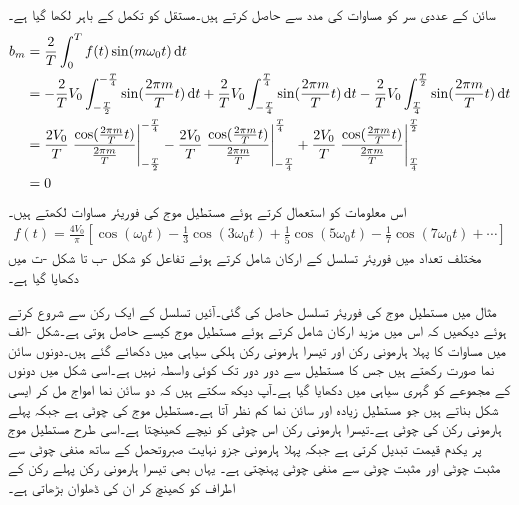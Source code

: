 سائن کے عددی سر  کو مساوات  کی مدد سے حاصل کرتے ہیں۔مستقل  کو تکمل کے باہر لکھا گیا ہے۔
\begin{align*}
b_m&=\frac{2}{T}\int_0^T f(t)\sin(m\omega_0 t) \dif t\\
&=-\frac{2}{T}V_0\int_{-\frac{T}{2}}^{-\frac{T}{4}} \sin (\frac{2\pi m}{T} t) \dif t+\frac{2}{T}V_0\int_{-\frac{T}{4}}^{\frac{T}{4}} \sin (\frac{2\pi m}{T} t) \dif t-\frac{2}{T}V_0\int_{\frac{T}{4}}^{\frac{T}{2}} \sin (\frac{2\pi m}{T} t) \dif t\\
&=\frac{2V_0}{T}\left.\frac{\cos (\frac{2\pi m}{T} t)}{\frac{2\pi m}{T}}\right|_{-\frac{T}{2}}^{-\frac{T}{4}}-\frac{2V_0}{T}\left.\frac{\cos (\frac{2\pi m}{T} t)}{\frac{2\pi m}{T}}\right|_{-\frac{T}{4}}^{\frac{T}{4}}+\frac{2V_0}{T}\left.\frac{\cos (\frac{2\pi m}{T} t)}{\frac{2\pi m}{T}}\right|_{\frac{T}{4}}^{\frac{T}{2}}\\
&=0
\end{align*}
اس معلومات کو استعمال کرتے ہوئے مستطیل موج کی فوریئر مساوات لکھتے ہیں۔
\begin{align}\label{مساوات_فوریئر_مستطیل_موج}
f(t)=\frac{4V_0}{\pi}\left[\cos (\omega_0 t)-\frac{1}{3}\cos(3\omega_0 t)+\frac{1}{5}\cos(5\omega_0 t)-\frac{1}{7}\cos(7\omega_0 t)+\cdots\right]
\end{align}
مختلف تعداد میں فوریئر تسلسل کے ارکان شامل کرتے ہوئے تفاعل کو شکل -ب تا شکل -ت میں دکھایا گیا ہے۔

مثال  میں مستطیل موج کی فوریئر تسلسل  حاصل کی گئی۔آئیں تسلسل کے ایک رکن سے شروع کرتے ہوئے دیکھیں کہ اس میں مزید ارکان شامل کرتے ہوئے مستطیل موج کیسے حاصل ہوتی ہے۔شکل -الف میں  مساوات  کا پہلا ہارمونی رکن  اور تیسرا ہارمونی رکن  ہلکی سیاہی میں دکھائے گئے ہیں۔دونوں سائن نما صورت رکھتے ہیں جس کا مستطیل سے دور دور تک کوئی واسطہ نہیں ہے۔اسی شکل میں دونوں کے مجموعے کو گہری سیاہی میں دکھایا گیا ہے۔آپ دیکھ سکتے ہیں کہ دو سائن نما امواج مل کر ایسی شکل بناتے ہیں جو مستطیل زیادہ اور سائن نما کم نظر آتا ہے۔مستطیل موج کی چوٹی  ہے جبکہ پہلے ہارمونی رکن کی چوٹی  ہے۔تیسرا ہارمونی رکن اس چوٹی کو نیچے کھینچتا ہے۔اسی طرح مستطیل موج  پر یکدم قیمت تبدیل کرتی ہے جبکہ پہلا ہارمونی جزو نہایت صبروتحمل کے ساتھ منفی چوٹی سے مثبت چوٹی اور مثبت چوٹی سے منفی چوٹی پہنچتی ہے۔ یہاں بھی تیسرا ہارمونی رکن پہلے رکن کے اطراف کو کھینچ کر ان کی ڈھلوان بڑھاتی ہے۔

